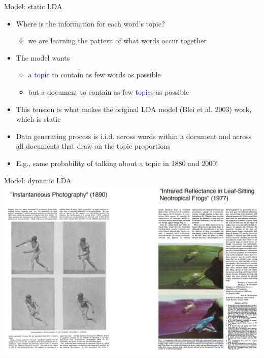 \documentclass[english]{beamer}
\begin{document}
\begin{frame}{Model: static LDA}
\begin{itemize}
\setlength{\itemsep}{1.2em}
    \item Where is the information for each word's topic?
    \begin{itemize}\vspace{5pt}
        \item we are learning the pattern of what words occur together
    \end{itemize}
    \item The model wants
    \begin{itemize}\vspace{5pt}\setlength{\itemsep}{0.5em}
        \item a \textcolor{blue}{topic} to contain as few words as possible
        \item but a document to contain as few \textcolor{blue}{topics} as possible
    \end{itemize}
\item This tension is what makes the original LDA model (Blei et al. 2003) work, which is static
\item Data generating process is i.i.d. across words within a document and across all documents that draw on the topic proportions 
\item E.g., same probability of talking about a topic in 1880 and 2000!
\end{itemize}
\end{frame}
\begin{frame}{Model: dynamic LDA}
\includegraphics[width=0.9 \textwidth]{Images/photos_overtime.png}
\end{frame}
\end{document}
